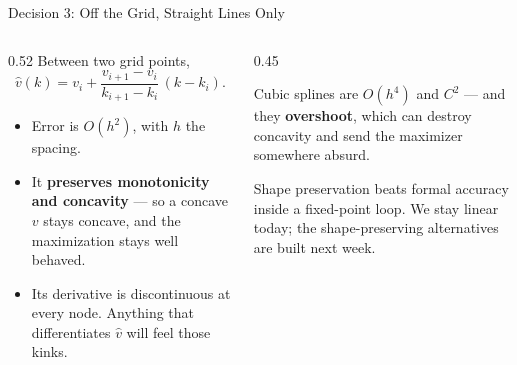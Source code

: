 \begin{frame}{Decision 3: Off the Grid, Straight Lines Only}
\begin{columns}[T]
\begin{column}{0.52\textwidth}
\small
Between two grid points,
\[
  \hat v(k)=v_i+\frac{v_{i+1}-v_i}{k_{i+1}-k_i}\,(k-k_i).
\]
\begin{itemize}\footnotesize
  \item Error is $O(h^2)$, with $h$ the spacing.
  \item It \textbf{preserves monotonicity and concavity} --- so a concave $v$ stays concave, and the maximization stays well behaved.
  \item Its derivative is discontinuous at every node. Anything that differentiates $\hat v$ will feel those kinks.
\end{itemize}
\end{column}
\begin{column}{0.45\textwidth}
\begin{conceptbox}[title=\textbf{Why not something smoother?}]\small
Cubic splines are $O(h^4)$ and $C^2$ --- and they \textbf{overshoot}, which can destroy concavity and send the maximizer somewhere absurd.
\end{conceptbox}
\medskip
\begin{takeawaybox}\footnotesize
Shape preservation beats formal accuracy inside a fixed-point loop. We stay linear today; the shape-preserving alternatives are built next week.
\end{takeawaybox}
\end{column}
\end{columns}
\vspace{1mm}
\end{frame}

